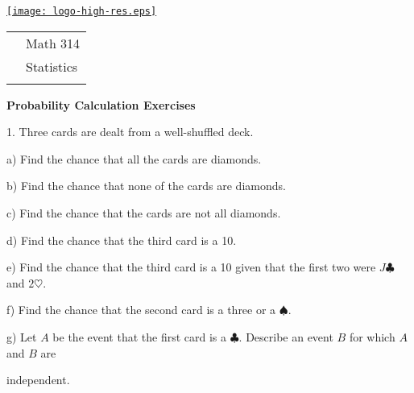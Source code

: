 \documentclass[10pt]{article}
\begin{document}
\pagestyle{empty}
\lstset{language=R, showspaces=false, showstringspaces=false}

\href{http://www.shepherd.edu}{\texttt{[image: logo-high-res.eps]}}
\vspace{-1.79cm}

{\small
\begin{tabular}{cl}
& Math 314\\
& Statistics\\
\hspace{5.28in} & %
\end{tabular}
}
\setlength{\baselineskip}{1.05\baselineskip}

\begin{center}
\textbf{\large  Probability Calculation Exercises}
\end{center}

1. Three cards are dealt from a well-shuffled deck.
\smallskip

\hspace{20pt} a) Find the chance that all the cards are diamonds.
\vspace{0.75in}

\hspace{20pt} b) Find the chance that none of the cards are diamonds.
\vspace{0.75in}

\hspace{20pt} c) Find the chance that the cards are not all diamonds.
\vspace{0.75in}

\hspace{20pt} d) Find the chance that the third card is a 10.
\vspace{0.75in}

\hspace{20pt} e) Find the chance that the third card is a 10 given that the first two 
were $J\clubsuit$ and $2\heartsuit$.
\vspace{0.75in}

\hspace{20pt} f) Find the chance that the second card is a three or a $\spadesuit$.
\vspace{0.75in}

\hspace{20pt} g) Let $A$ be the event that the first card is a $\clubsuit$. 
Describe an event $B$ for which $A$ and $B$ are\vspace{-3pt}

\hspace{20pt} \hphantom{g) } independent.
\vspace{1in}
\end{document}
